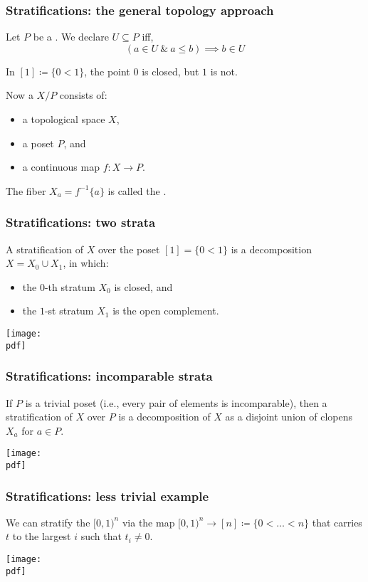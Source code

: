 \documentclass[11pt,xcolor={dvipsnames},hyperref={pdftex,pdfpagemode=UseNone,hidelinks,pdfdisplaydoctitle=true},usepdftitle=false]{beamer}
\newcommand{\pdf}{figures.pdf}
\begin{document}
\begin{frame}
  \frametitle{Stratifications: the general topology approach}
  Let $P$ be a .
  We declare $U \subseteq P$  iff,
  \[
    (a \in U\ \&\ a \leq b) \implies b \in U
  \]

  \begin{example}
    In $[1] \coloneq \{0 < 1\}$, the point $0$ is closed, but $1$ is not.
  \end{example}

  Now a  $X/P$ consists of:
  \begin{itemize}
    \item a topological space $X$,
    \item a poset $P$, and
    \item a continuous map $f \colon X \to P$.
  \end{itemize}
  The fiber $X_a = f^{-1}\{a\}$ is called the .
\end{frame}

\begin{frame}
  \frametitle{Stratifications: two strata}
  \begin{example}
    A stratification of $X$ over the poset $[1] = \{0 < 1\}$ is a decomposition $X = X_0 \cup X_1$, in which:
    \begin{itemize}
      \item the $0$-th stratum $X_0$ is closed, and
      \item the $1$-st stratum $X_1$ is the open complement.
    \end{itemize}
    \texttt{[image: \\pdf]}%
  \end{example}
\end{frame}

\begin{frame}
  \frametitle{Stratifications: incomparable strata}
  \begin{example}
    If $P$ is a trivial poset (i.e., every pair of elements is incomparable), then
    a stratification of $X$ over $P$ is a decomposition of $X$ as a disjoint union of clopens $X_a$ for $a \in P$.

    \texttt{[image: \\pdf]}%
  \end{example}
\end{frame}

\begin{frame}
  \frametitle{Stratifications: less trivial example}
  \begin{example}
    We can stratify the  $[0,1)^n$ via the map
    $[0,1)^n \to [n] \coloneq \{0 < \dots < n\}$
    that carries $t$ to the largest $i$ such that $t_i \neq 0$.

    \texttt{[image: \\pdf]}%
  \end{example}
\end{frame}
\end{document}
